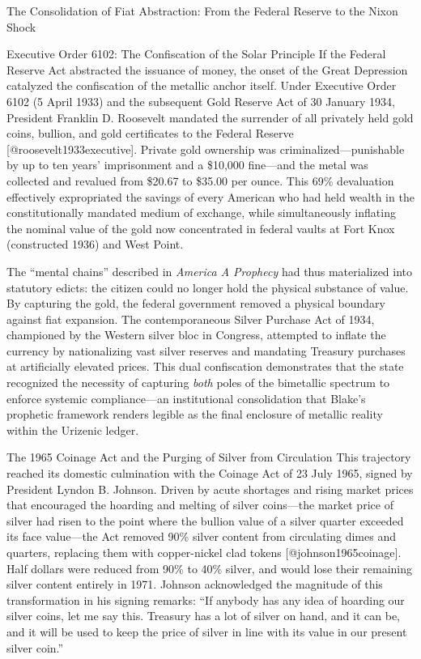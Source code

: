 \documentclass[
  ignorenonframetext,
]{beamer}
\begin{document}
\begin{frame}{The Consolidation of Fiat Abstraction: From the Federal
Reserve to the Nixon Shock}
\begin{block}{Executive Order 6102: The Confiscation of the Solar
Principle}
\protect{}\label{executive-order-6102-the-confiscation-of-the-solar-principle}
If the Federal Reserve Act abstracted the issuance of money, the onset
of the Great Depression catalyzed the confiscation of the metallic
anchor itself. Under Executive Order 6102 (5 April 1933) and the
subsequent Gold Reserve Act of 30 January 1934, President Franklin D.
Roosevelt mandated the surrender of all privately held gold coins,
bullion, and gold certificates to the Federal Reserve
{[}@roosevelt1933executive{]}. Private gold ownership was
criminalized---punishable by up to ten years' imprisonment and a
\$10,000 fine---and the metal was collected and revalued from \$20.67 to
\$35.00 per ounce. This 69\% devaluation effectively expropriated the
savings of every American who had held wealth in the constitutionally
mandated medium of exchange, while simultaneously inflating the nominal
value of the gold now concentrated in federal vaults at Fort Knox
(constructed 1936) and West Point.

The ``mental chains'' described in \emph{America A Prophecy} had thus
materialized into statutory edicts: the citizen could no longer hold the
physical substance of value. By capturing the gold, the federal
government removed a physical boundary against fiat expansion. The
contemporaneous Silver Purchase Act of 1934, championed by the Western
silver bloc in Congress, attempted to inflate the currency by
nationalizing vast silver reserves and mandating Treasury purchases at
artificially elevated prices. This dual confiscation demonstrates that
the state recognized the necessity of capturing \emph{both} poles of the
bimetallic spectrum to enforce systemic compliance---an institutional
consolidation that Blake's prophetic framework renders legible as the
final enclosure of metallic reality within the Urizenic ledger.
\end{block}

\begin{block}{The 1965 Coinage Act and the Purging of Silver from
Circulation}
\protect{}\label{the-1965-coinage-act-and-the-purging-of-silver-from-circulation}
This trajectory reached its domestic culmination with the Coinage Act of
23 July 1965, signed by President Lyndon B. Johnson. Driven by acute
shortages and rising market prices that encouraged the hoarding and
melting of silver coins---the market price of silver had risen to the
point where the bullion value of a silver quarter exceeded its face
value---the Act removed 90\% silver content from circulating dimes and
quarters, replacing them with copper-nickel clad tokens
{[}@johnson1965coinage{]}. Half dollars were reduced from 90\% to 40\%
silver, and would lose their remaining silver content entirely in 1971.
Johnson acknowledged the magnitude of this transformation in his signing
remarks: ``If anybody has any idea of hoarding our silver coins, let me
say this. Treasury has a lot of silver on hand, and it can be, and it
will be used to keep the price of silver in line with its value in our
present silver coin.''


\end{block}
\end{frame}
\end{document}
